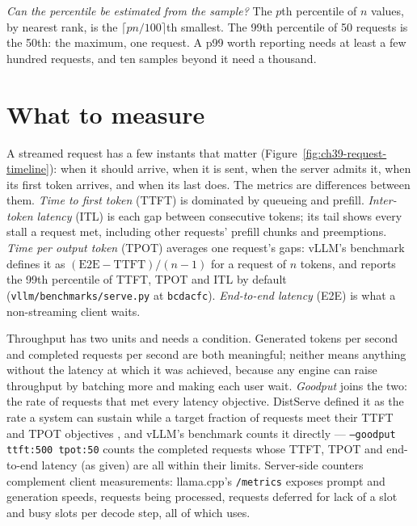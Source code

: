 \emph{Can the percentile be estimated from the sample?} The $p$th percentile of
$n$ values, by nearest rank, is the $\lceil pn/100 \rceil$th smallest. The 99th
percentile of 50 requests is the 50th: the maximum, one request. A p99 worth
reporting needs at least a few hundred requests, and ten samples beyond it
need a thousand.

\section{What to measure}

A streamed request has a few instants that matter
(Figure~\ref{fig:ch39-request-timeline}): when it should arrive, when it is
sent, when the server admits it, when its first token arrives, and when its last
does. The metrics are differences between them. \emph{Time to first token}
(TTFT) is dominated by queueing and prefill. \emph{Inter-token latency} (ITL) is
each gap between consecutive tokens; its tail shows every stall a request met,
including other requests' prefill chunks and preemptions. \emph{Time per output
token} (TPOT) averages one request's gaps: vLLM's benchmark defines it as
$(\text{E2E} - \text{TTFT})/(n - 1)$ for a request of $n$ tokens, and reports
the 99th percentile of TTFT, TPOT and ITL by default
(\texttt{vllm/benchmarks/serve.py} at \texttt{bcdacfc}). \emph{End-to-end
latency} (E2E) is what a non-streaming client waits.


Throughput has two units and needs a condition. Generated tokens per second
and completed requests per second are both meaningful; neither means anything
without the latency at which it was achieved, because any engine can raise
throughput by batching more and making each user wait. \emph{Goodput} joins the
two: the rate of requests that met every latency objective. DistServe defined it
as the rate a system can sustain while a target fraction of requests meet their
TTFT and TPOT objectives \cite{zhong2024distserve}, and vLLM's benchmark counts
it directly --- \texttt{--goodput ttft:500 tpot:50} counts the completed requests
whose TTFT, TPOT and end-to-end latency (as given) are all within their
limits. Server-side counters complement client measurements: llama.cpp's
\texttt{/metrics} exposes prompt and generation speeds, requests being processed,
requests deferred for lack of a slot and busy slots per decode step, all of which
 uses.

